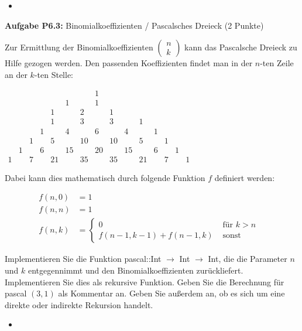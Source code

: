 \begin{itemize}
  \item []\inputminted{Haskell}{A6_2.hs}
\end{itemize}

\newpage

\textbf{Aufgabe P6.3:} Binomialkoeffizienten / Pascalsches Dreieck (2 Punkte)

Zur Ermittlung der Binomialkoeffizienten $\left(\begin{array}{l}n \\ k\end{array}\right)$ kann das Pascalsche Dreieck zu Hilfe gezogen werden. Den passenden Koeffizienten findet man in der $n$-ten Zeile an der $k$-ten Stelle:

$\begin{array}{cccccccccccccccc} & & & & & & & 1 & & & & & & & \\ & & & & & 1 & & 1 & & & & & & \\ & & & & 1 & & 2 & & 1 & & & & & \\ & & & & 1 & & 3 & & 3 & & 1 & & & \\ & & & 1 & & 4 & & 6 & & 4 & & 1 & & \\ & & 1 & & 5 & & 10 & & 10 & & 5 & & 1 & & \\ & 1 & & 6 & & 15 & & 20 & & 15 & & 6 & & 1 & \\ 1 & & 7 & & 21 & & 35 & & 35 & & 21 & & 7 & & 1\end{array}$

Dabei kann dies mathematisch durch folgende Funktion $f$ definiert werden:

$$
\begin{array}{rlr}
f(n, 0) & =1 \\
f(n, n) & =1 & \\
f(n, k) & = \begin{cases}0 & \text { für } k>n \\
f(n-1, k-1)+f(n-1, k) & \text { sonst }\end{cases}
\end{array}
$$

Implementieren Sie die Funktion pascal::Int $\rightarrow$ Int $\rightarrow$ Int, die die Parameter $n$ und $k$ entgegennimmt und den Binomialkoeffizienten zurückliefert. Implementieren Sie dies als rekursive Funktion. Geben Sie die Berechnung für pascal $(3,1)$ als Kommentar an. Geben Sie außerdem an, ob es sich um eine direkte oder indirekte Rekursion handelt.

\begin{itemize}
  \item []\inputminted{Haskell}{A6_3.hs}
\end{itemize}

